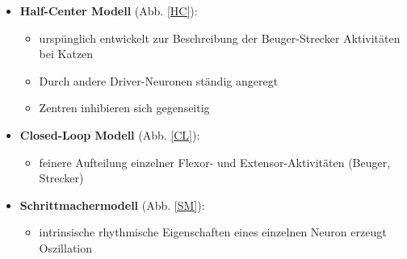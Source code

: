 \begin{itemize}
\item \textbf{Half-Center Modell} (Abb. \ref{HC}):
\begin{itemize}
\item urspünglich entwickelt zur Beschreibung der Beuger-Strecker Aktivitäten bei Katzen
\item Durch andere \glqq Driver\grqq -Neuronen ständig angeregt
\item Zentren inhibieren sich gegenseitig
\end{itemize}
\item \textbf{Closed-Loop Modell} (Abb. \ref{CL}):
\begin{itemize}
\item feinere Aufteilung einzelner Flexor- und Extensor-Aktivitäten (Beuger, Strecker)
\end{itemize}
\item \textbf{Schrittmachermodell} (Abb. \ref{SM}):
\begin{itemize}
\item intrinsische rhythmische Eigenschaften eines einzelnen Neuron erzeugt Oszillation
\end{itemize}
\end{itemize}
